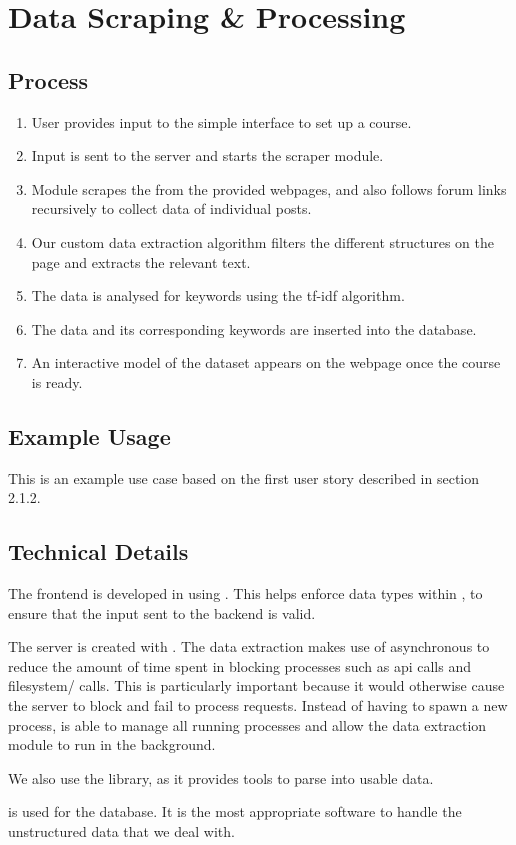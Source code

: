 \section{Data Scraping \& Processing}
\subsection{Process}
\begin{enumerate}
    \item{User provides input to the simple interface to set up a course.}
    \item{Input is sent to the server and starts the scraper module.}
    \item{Module scrapes the  from the provided webpages, and also follows forum links recursively to collect data of individual posts.}
    \item{Our custom data extraction algorithm filters the different structures on the page and extracts the relevant text.}
    \item{The data is analysed for keywords using the tf-idf algorithm.}
    \item{The data and its corresponding keywords are inserted into the database.}
    \item{An interactive model of the dataset appears on the webpage once the course is ready.}
\end{enumerate}

\subsection{Example Usage}
This is an example use case based on the first user story described in section 2.1.2.

\subsection{Technical Details}
The frontend is developed in  using . This helps enforce data types within , to ensure that the input sent to the backend is valid.

The server is created with . The data extraction makes use of asynchronous  to reduce the amount of time spent in blocking processes such as api calls and filesystem/ calls. This is particularly important because it would otherwise cause the server to block and fail to process requests. Instead of having to spawn a new process,  is able to manage all running processes and allow the data extraction module to run in the background.

We also use the  library, as it provides tools to parse  into usable data.

 is used for the database. It is the most appropriate software to handle the unstructured data that we deal with.

\newpage
